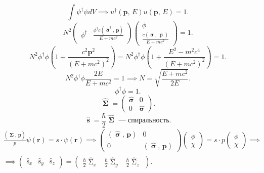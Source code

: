 \documentclass[a4paper]{article}
\begin{document}
\[
\int \psi^\dagger \psi dV\implies
u^\dagger \left( \mathbf{p},\,E \right) u\left( \mathbf{p},\,E \right) =1
.\] 
\[
	N^2 \begin{pmatrix} \phi^\dagger &
	\frac{\phi^\dagger c \left( \widehat{\operatorname{\boldsymbol{\sigma}}}^\dagger,\,\mathbf{p} \right) }{E+mc^2}\end{pmatrix} 
	\begin{pmatrix} \phi \\
	\frac{c\left( \widehat{\operatorname{\boldsymbol{\sigma}}},\,
\widehat{\operatorname{\mathbf{p}}}\right) }{E+mc^2}\end{pmatrix} =1
.\] 
\[
	N^2 \phi^\dagger \phi \left( 1+ \frac{c^2 \mathbf{p}^2}{
	(E+mc^2)^2} \right) =
	N^2 \phi^\dagger \phi \left( 1+ \frac{E^2 -m^2 c^4}{
	(E+mc^2)^2} \right) =1
.\] 
\[
N^2 \phi^\dagger \phi \frac{2E}{E+mc^2}=1\implies
N= \sqrt{\frac{E+mc^2}{2E}} 
.\] 
\[
\phi^\dagger \phi=1
.\] 
\[
\widehat{\operatorname{\boldsymbol{\Sigma}}}=
\begin{pmatrix} \widehat{\operatorname{\boldsymbol{\sigma}}}&0\\
0& \widehat{\operatorname{\boldsymbol{\sigma}}}\end{pmatrix} 
.\] 
\[
	\widehat{\operatorname{\mathbf{s}}}= \frac{\hbar}{2}
	\widehat{\operatorname{\boldsymbol{\Sigma}}} \text{ ---
	спиральность}
.\] 
\begin{multline*}
	\frac{\left( \widehat{\operatorname{\boldsymbol{\Sigma}}},\,
	\mathbf{p}\right) }{p}\psi(\mathbf{r})=
	s\cdot \psi(\mathbf{r})\implies
	\begin{pmatrix} \left( \widehat{\operatorname{\boldsymbol{\sigma}}},\,\mathbf{p} \right) & 0\\ 0 &
	\left( \widehat{\operatorname{\boldsymbol{\sigma}}},\,\mathbf{p} \right) \end{pmatrix} \begin{pmatrix} \phi \\ \chi \end{pmatrix} =
	s\cdot p \begin{pmatrix}  \phi \\ \chi \end{pmatrix} \implies\\
	\implies
	\begin{pmatrix} \widehat{\operatorname{s}}_x &
	\widehat{\operatorname{s}}_y &
\widehat{\operatorname{s}}_z\end{pmatrix} =
		\begin{pmatrix}  \frac{\hbar}{2} \widehat{\operatorname{\Sigma}}_x&
\frac{\hbar}{2} \widehat{\operatorname{\Sigma}}_y &
\frac{\hbar}{2} \widehat{\operatorname{\Sigma}}_z\end{pmatrix} 
.\end{multline*} 
\end{document}
